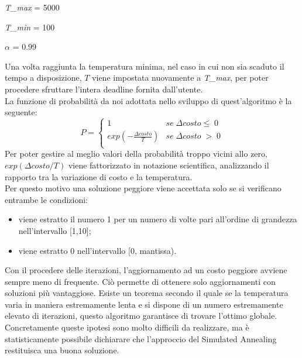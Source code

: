 \begin{itemize}
\begin{multicols}{3}
\item{\textit{T\_max} = 5000}
\item{\textit{T\_min} = 100}
\item{\textit{$\alpha$} = 0.99}
\end{multicols}
\end{itemize}
Una volta raggiunta la temperatura minima, nel caso in cui non sia scaduto il tempo a disposizione, $T$ viene impostata nuovamente a \textit{T\_max}, per poter procedere sfruttare l'intera deadline fornita dall'utente.\\ 
La funzione di probabilità da noi adottata nello sviluppo di quest'algoritmo è la seguente\cite{SA}:
$$P = 
\begin{cases}
1 & se\; \Delta costo \leq \;0\\
exp(- \frac{\Delta costo}{T}) & se\; \Delta costo \;>\;0\\
\end{cases}
$$ 
Per poter gestire al meglio valori della probabilità troppo vicini allo zero, $exp(\Delta costo/T)$ viene fattorizzato in notazione scientifica, analizzando il rapporto tra la variazione di costo e la temperatura.\\Per questo motivo una soluzione peggiore viene accettata solo se si verificano entrambe le condizioni:
\begin{itemize}
\item{viene estratto il numero 1 per un numero di volte pari all'ordine di grandezza nell'intervallo [1,10];}
\item{viene estratto 0 nell'intervallo [0, mantissa).}
\end{itemize} 
 Con il procedere delle iterazioni, l'aggiornamento ad un costo peggiore avviene sempre meno di frequente. Ciò permette di ottenere solo aggiornamenti con soluzioni più vantaggiose. Esiste un teorema secondo il quale se la temperatura varia in maniera estremamente lenta e si dispone di un numero estremamente elevato di iterazioni, questo algoritmo garantisce di trovare l'ottimo globale. Concretamente queste ipotesi sono molto difficili da realizzare, ma è statisticamente possibile dichiarare che l'approccio del Simulated Annealing restituisca una buona soluzione.
